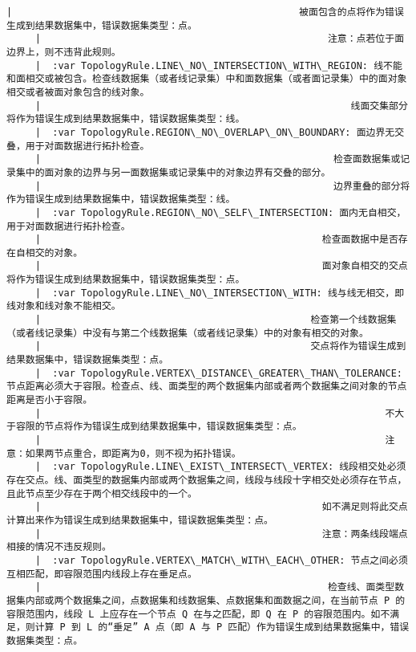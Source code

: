 \documentclass[11pt]{article}
\begin{document}
\begin{Verbatim}[commandchars=\\\{\}]
     |                                                  被面包含的点将作为错误生成到结果数据集中，错误数据集类型：点。
     |                                                  注意：点若位于面边界上，则不违背此规则。
     |  :var TopologyRule.LINE\_NO\_INTERSECTION\_WITH\_REGION: 线不能和面相交或被包含。检查线数据集（或者线记录集）中和面数据集（或者面记录集）中的面对象相交或者被面对象包含的线对象。
     |                                                      线面交集部分将作为错误生成到结果数据集中，错误数据集类型：线。
     |  :var TopologyRule.REGION\_NO\_OVERLAP\_ON\_BOUNDARY: 面边界无交叠，用于对面数据进行拓扑检查。
     |                                                   检查面数据集或记录集中的面对象的边界与另一面数据集或记录集中的对象边界有交叠的部分。
     |                                                   边界重叠的部分将作为错误生成到结果数据集中，错误数据集类型：线。
     |  :var TopologyRule.REGION\_NO\_SELF\_INTERSECTION: 面内无自相交，用于对面数据进行拓扑检查。
     |                                                 检查面数据中是否存在自相交的对象。
     |                                                 面对象自相交的交点将作为错误生成到结果数据集中，错误数据集类型：点。
     |  :var TopologyRule.LINE\_NO\_INTERSECTION\_WITH: 线与线无相交，即线对象和线对象不能相交。
     |                                               检查第一个线数据集（或者线记录集）中没有与第二个线数据集（或者线记录集）中的对象有相交的对象。
     |                                               交点将作为错误生成到结果数据集中，错误数据集类型：点。
     |  :var TopologyRule.VERTEX\_DISTANCE\_GREATER\_THAN\_TOLERANCE: 节点距离必须大于容限。检查点、线、面类型的两个数据集内部或者两个数据集之间对象的节点距离是否小于容限。
     |                                                            不大于容限的节点将作为错误生成到结果数据集中，错误数据集类型：点。
     |                                                            注意：如果两节点重合，即距离为0，则不视为拓扑错误。
     |  :var TopologyRule.LINE\_EXIST\_INTERSECT\_VERTEX: 线段相交处必须存在交点。线、面类型的数据集内部或两个数据集之间，线段与线段十字相交处必须存在节点，且此节点至少存在于两个相交线段中的一个。
     |                                                 如不满足则将此交点计算出来作为错误生成到结果数据集中，错误数据集类型：点。
     |                                                 注意：两条线段端点相接的情况不违反规则。
     |  :var TopologyRule.VERTEX\_MATCH\_WITH\_EACH\_OTHER: 节点之间必须互相匹配，即容限范围内线段上存在垂足点。
     |                                                  检查线、面类型数据集内部或两个数据集之间，点数据集和线数据集、点数据集和面数据之间，在当前节点 P 的容限范围内，线段 L 上应存在一个节点 Q 在与之匹配，即 Q 在 P 的容限范围内。如不满足，则计算 P 到 L 的“垂足” A 点（即 A 与 P 匹配）作为错误生成到结果数据集中，错误数据集类型：点。

\end{Verbatim}
\end{document}
